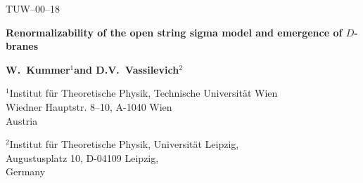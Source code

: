 \documentclass[a4paper,12pt]{article}
\begin{document}
\begin{titlepage} \renewcommand{\thefootnote}{\fnsymbol{footnote}}

\hfill{}TUW--00--18 \\


{\par\centering \vspace{1cm}\par}

{\par\centering \textbf{\large 
Renormalizability of the open 
string sigma model and emergence of $D$-branes
}\large \par}

{\par\centering \vspace{1.0cm} \vfill
\renewcommand{\baselinestretch}{1}\par}

{\par\centering \textbf{W.\ Kummer\( ^{1} \)\footnotemark[1] 
and D.V.\ Vassilevich\( ^{2} \)\footnotemark[2] \footnotemark[3]{}} 
\vspace{7ex}\par}

{\par\centering \( ^{1} \)Institut f\"{u}r Theoretische Physik, Technische
Universit\"{a}t Wien \\
 Wiedner Hauptstr. 8--10, A-1040 Wien \\
 Austria \vspace{2ex}\par}

{\par\centering \( ^{2} \)Institut f\"{u}r Theoretische Physik, Universit\"{a}t
Leipzig,\\
 Augustusplatz 10, D-04109 Leipzig,\\
 Germany\par}

{\par\centering {}  \par}

\vfill


\end{titlepage}
\end{document}
